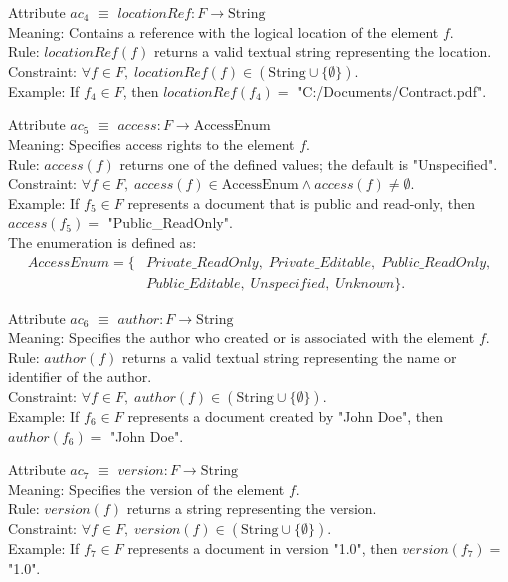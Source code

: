 \documentclass{article}
\begin{document}
Attribute \( ac_4 \) $\equiv$ \( locationRef : F \rightarrow \text{String} \) \\
Meaning: Contains a reference with the logical location of the element \( f \). \\
Rule: \( locationRef(f) \) returns a valid textual string representing the location. \\
Constraint: \( \forall f \in F,\; locationRef(f) \in (\text{String} \cup \{\emptyset\}) \). \\
Example: If \( f_4 \in F \), then \( locationRef(f_4) = \) "C:/Documents/Contract.pdf".

\vspace{0.8em}

Attribute \( ac_5 \) $\equiv$ \( access : F \rightarrow \text{AccessEnum} \) \\
Meaning: Specifies access rights to the element \( f \). \\
Rule: \( access(f) \) returns one of the defined values; the default is "Unspecified". \\
Constraint: \( \forall f \in F,\; access(f) \in \text{AccessEnum} \wedge access(f) \neq \emptyset \). \\
Example: If \( f_5 \in F \) represents a document that is public and read-only, then \( access(f_5) = \) "Public\_ReadOnly". \\
The enumeration  is defined as:
{\begin{align*}
AccessEnum = \{ &Private\_ReadOnly,\;Private\_Editable,\;Public\_ReadOnly,\nonumber \\  
&Public\_Editable,\;Unspecified,\;Unknown \}.
\end{align*}}

Attribute \( ac_6 \) $\equiv$ \( author : F \rightarrow \text{String} \) \\
Meaning: Specifies the author who created or is associated with the element \( f \). \\
Rule: \( author(f) \) returns a valid textual string representing the name or identifier of the author. \\
Constraint: \( \forall f \in F,\; author(f) \in (\text{String} \cup \{\emptyset\}) \). \\
Example: If \( f_6 \in F \) represents a document created by "John Doe", then \( author(f_6) = \) "John Doe".

\vspace{0.8em}

Attribute \( ac_7 \) $\equiv$ \( version : F \rightarrow \text{String} \) \\
Meaning: Specifies the version of the element \( f \). \\
Rule: \( version(f) \) returns a string representing the version. \\
Constraint: \( \forall f \in F,\; version(f) \in (\text{String} \cup \{\emptyset\}) \). \\
Example: If \( f_7 \in F \) represents a document in version "1.0", then \( version(f_7) = \) "1.0".
\end{document}
